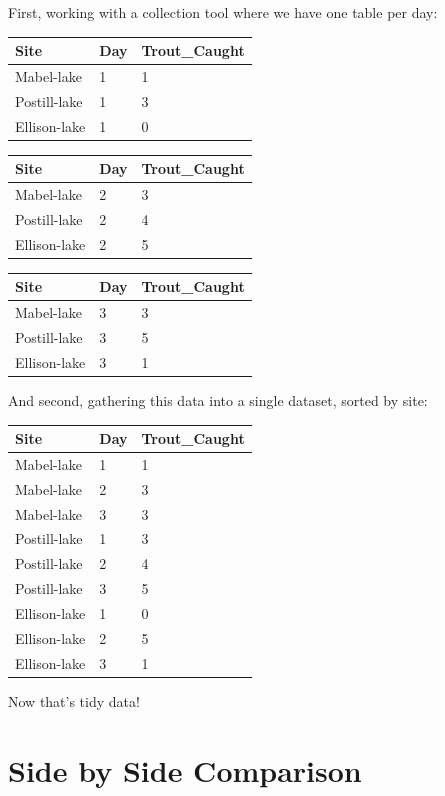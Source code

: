 \documentclass[
]{book}
\begin{document}
First, working with a collection tool where we have one table per day:

\begin{longtable}[]{@{}lll@{}}
\toprule
Site & Day & Trout\_Caught \\
\midrule
\endhead
Mabel-lake & 1 & 1 \\
Postill-lake & 1 & 3 \\
Ellison-lake & 1 & 0 \\
\bottomrule
\end{longtable}

\begin{longtable}[]{@{}lll@{}}
\toprule
Site & Day & Trout\_Caught \\
\midrule
\endhead
Mabel-lake & 2 & 3 \\
Postill-lake & 2 & 4 \\
Ellison-lake & 2 & 5 \\
\bottomrule
\end{longtable}

\begin{longtable}[]{@{}lll@{}}
\toprule
Site & Day & Trout\_Caught \\
\midrule
\endhead
Mabel-lake & 3 & 3 \\
Postill-lake & 3 & 5 \\
Ellison-lake & 3 & 1 \\
\bottomrule
\end{longtable}

And second, gathering this data into a single dataset, sorted by site:

\begin{longtable}[]{@{}lll@{}}
\toprule
Site & Day & Trout\_Caught \\
\midrule
\endhead
Mabel-lake & 1 & 1 \\
Mabel-lake & 2 & 3 \\
Mabel-lake & 3 & 3 \\
Postill-lake & 1 & 3 \\
Postill-lake & 2 & 4 \\
Postill-lake & 3 & 5 \\
Ellison-lake & 1 & 0 \\
Ellison-lake & 2 & 5 \\
Ellison-lake & 3 & 1 \\
\bottomrule
\end{longtable}

Now that's tidy data!

\hypertarget{side-by-side-comparison}{%
\section{Side by Side Comparison}\label{side-by-side-comparison}}
\end{document}
